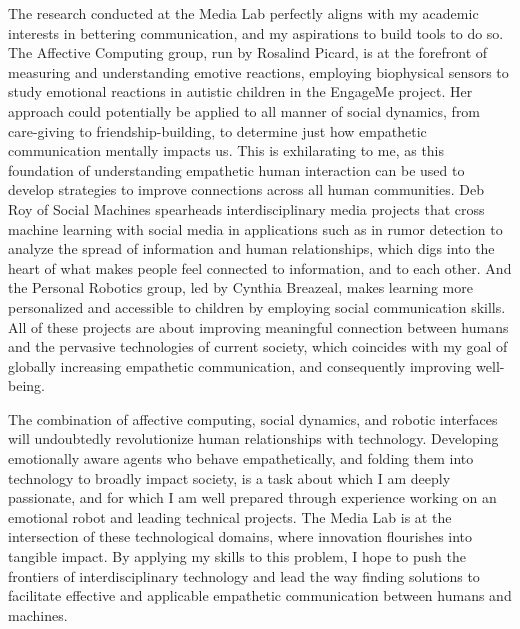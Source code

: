 \documentclass{article}
\begin{document}
	The research conducted at the Media Lab perfectly aligns with my academic interests in bettering communication, and my aspirations to build tools to do so.  The Affective Computing group, run by Rosalind Picard, is at the forefront of measuring and understanding emotive reactions, employing biophysical sensors to study emotional reactions in autistic children in the EngageMe project. Her approach could potentially be applied to all manner of social dynamics, from care-giving to friendship-building, to determine just how empathetic communication mentally impacts us. This is exhilarating to me, as this foundation of understanding empathetic human interaction can be used to develop strategies to improve connections across all human communities. Deb Roy of Social Machines spearheads interdisciplinary media projects that cross machine learning with social media in applications such as in rumor detection to analyze the spread of information and human relationships, which digs into the heart of what makes people feel connected to information, and to each other. And the Personal Robotics group, led by Cynthia Breazeal, makes learning more personalized and accessible to children by employing social communication skills. All of these projects are about improving meaningful connection between humans and the pervasive technologies of current society, which coincides with my goal of globally increasing empathetic communication, and consequently improving well-being. \par
	The combination of affective computing, social dynamics, and robotic interfaces will undoubtedly revolutionize human relationships with technology. Developing emotionally aware agents who behave empathetically, and folding them into technology to broadly impact society, is a task about which I am deeply passionate, and for which I am well prepared through experience working on an emotional robot and leading technical projects. The Media Lab is at the intersection of these technological domains, where innovation flourishes into tangible impact. By applying my skills to this problem, I hope to push the frontiers of interdisciplinary technology and lead the way finding solutions to facilitate effective and applicable empathetic communication between humans and machines.
\end{document}
